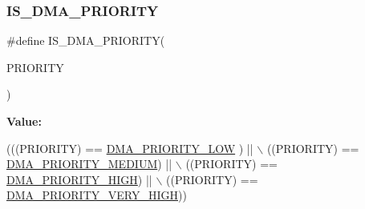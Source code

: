 \subsubsection{\texorpdfstring{I\+S\+\_\+\+D\+M\+A\+\_\+\+P\+R\+I\+O\+R\+I\+TY}{IS\_DMA\_PRIORITY}}
{\footnotesize\ttfamily \#define I\+S\+\_\+\+D\+M\+A\+\_\+\+P\+R\+I\+O\+R\+I\+TY(\begin{DoxyParamCaption}\item[{}]{P\+R\+I\+O\+R\+I\+TY }\end{DoxyParamCaption})}

{\bfseries Value\+:}
\begin{DoxyCode}
(((PRIORITY) == \hyperlink{group___d_m_a___priority__level_ga0d1ed2bc9229ba3c953002bcf3a72130}{DMA\_PRIORITY\_LOW} )   || \(\backslash\)
                                   ((PRIORITY) == \hyperlink{group___d_m_a___priority__level_gad6fbeee76fd4a02cbed64365bb4c1781}{DMA\_PRIORITY\_MEDIUM}) || \(\backslash\)
                                   ((PRIORITY) == \hyperlink{group___d_m_a___priority__level_ga6b2f5c5e22895f8b4bd52a27ec6cae2a}{DMA\_PRIORITY\_HIGH})   || \(\backslash\)
                                   ((PRIORITY) == \hyperlink{group___d_m_a___priority__level_gaed0542331a4d875d1d8d5b2878e9372c}{DMA\_PRIORITY\_VERY\_HIGH}))
\end{DoxyCode}
